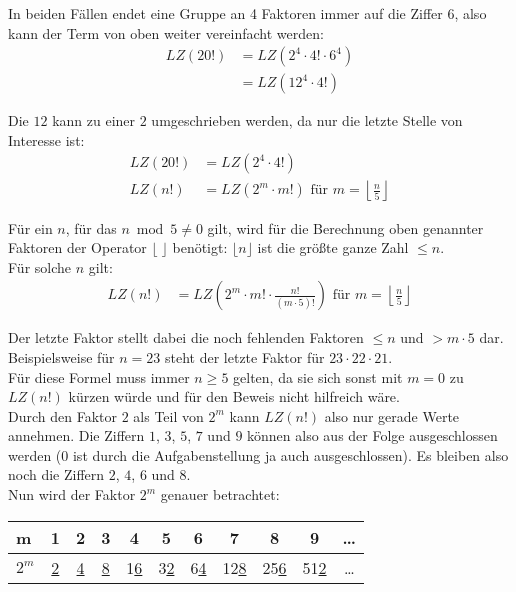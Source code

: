 \documentclass[12pt,a4paper,oneside]{article}
\begin{document}
In beiden Fällen endet eine Gruppe an 4 Faktoren immer auf die Ziffer $6$, also kann der Term von oben weiter vereinfacht werden:
\begin{equation*}
	\begin{split}
		LZ(20!) &= LZ\left(2^4 \cdot 4! \cdot 6^4\right) \\
		&= LZ\left(12^4 \cdot 4!\right)
	\end{split}
\end{equation*}

Die $12$ kann zu einer $2$ umgeschrieben werden, da nur die letzte Stelle von Interesse ist:
\begin{equation*}
	\begin{split}
		LZ(20!) &= LZ\left(2^4 \cdot 4!\right) \\
		LZ(n!) &= LZ\left(2^m \cdot m!\right) \text{ für } m = \left\lfloor\frac{n}{5}\right\rfloor
	\end{split}
\end{equation*}

Für ein $n$, für das $n\bmod 5 \neq 0$ gilt, wird für die Berechnung oben genannter Faktoren der Operator $\lfloor\;\rfloor$ benötigt: $\lfloor n \rfloor$ ist die größte ganze Zahl $\leq n$.
\\[10pt]
Für solche $n$ gilt:
\begin{equation*}
	\begin{split}
		LZ(n!) &= LZ\left(2^m \cdot m! \cdot \frac{n!}{(m\cdot5)!} \right) \text{ für } m = \left\lfloor\frac{n}{5}\right\rfloor
	\end{split}
\end{equation*}

Der letzte Faktor stellt dabei die noch fehlenden Faktoren $\leq n$ und $> m\cdot5$ dar. Beispielsweise für $n=23$ steht der letzte Faktor für $23\cdot22\cdot21$.
\\[10pt]
Für diese Formel muss immer $n\geq5$ gelten, da sie sich sonst mit $m=0$ zu $LZ(n!)$ kürzen würde und für den Beweis nicht hilfreich wäre.
\\[10pt]
Durch den Faktor $2$ als Teil von $2^m$ kann $LZ(n!)$ also nur gerade Werte annehmen. Die Ziffern $1$, $3$, $5$, $7$ und $9$ können also aus der Folge ausgeschlossen werden ($0$ ist durch die Aufgabenstellung ja auch ausgeschlossen). Es bleiben also noch die Ziffern $2$, $4$, $6$ und $8$.
\\[10pt]
Nun wird der Faktor $2^m$ genauer betrachtet:

\begin{table}[h!]
	\hspace{0.5cm}\begin{tabular}{l|c|c|c|c|c|c|c|c|c|c}
		m & 1 & 2 & 3 & 4 & 5 & 6 & 7 & 8 & 9 & \dots \\
		\hline
		$2^m$ & \underline{2} & \underline{4} & \underline{8} & 1\underline{6} & 3\underline{2} & 6\underline{4} & 12\underline{8} & 25\underline{6} & 51\underline{2} & \dots \\
	\end{tabular}
\end{table}
\end{document}
